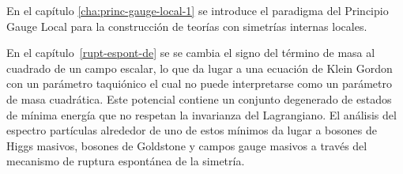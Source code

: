 
En el capítulo \ref{cha:princ-gauge-local-1} se introduce el paradigma del Principio Gauge Local para la construcción de teorías con simetrías internas locales.

En el capítulo~\ref{rupt-espont-de} se %
se cambia el signo del término de masa al cuadrado de un campo escalar, lo que da lugar a una ecuación de Klein Gordon con un parámetro taquiónico el cual no puede interpretarse como un parámetro de masa cuadrática. Este potencial contiene un conjunto degenerado de estados de mínima energía que no respetan la invarianza del Lagrangiano. El análisis del espectro partículas alrededor de uno de estos mínimos da lugar a bosones de Higgs masivos,  bosones de Goldstone y campos gauge masivos a través del mecanismo de ruptura espontánea de la simetría. 


